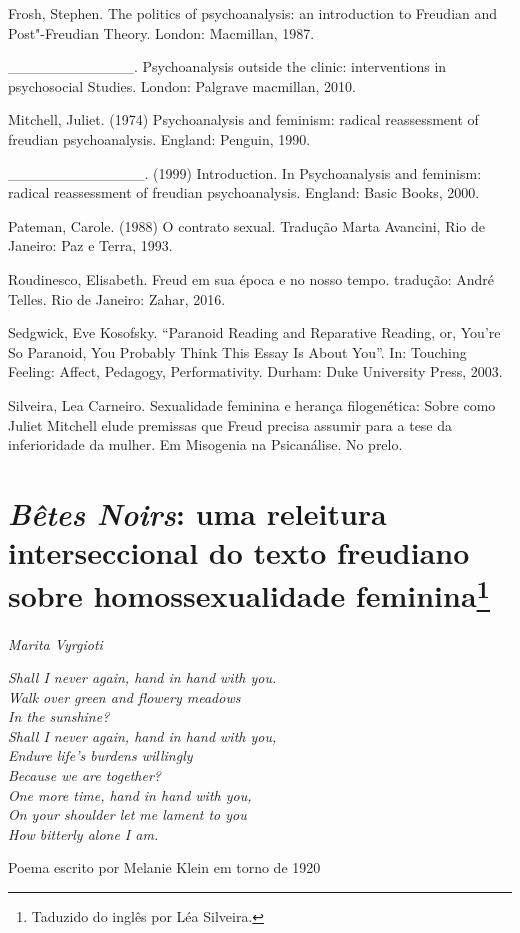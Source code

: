 Frosh, Stephen. The politics of psychoanalysis: an introduction to
Freudian and Post"-Freudian Theory. London: Macmillan, 1987.

\_\_\_\_\_\_\_\_\_\_\_\_. Psychoanalysis outside the clinic:
interventions in psychosocial Studies. London: Palgrave macmillan, 2010.

Mitchell, Juliet. (1974) Psychoanalysis and feminism: radical
reassessment of freudian psychoanalysis. England: Penguin, 1990.

\_\_\_\_\_\_\_\_\_\_\_\_\_. (1999) Introduction. In Psychoanalysis and
feminism: radical reassessment of freudian psychoanalysis. England:
Basic Books, 2000.

Pateman, Carole. (1988) O contrato sexual. Tradução Marta Avancini, Rio
de Janeiro: Paz e Terra, 1993.

Roudinesco, Elisabeth. Freud em sua época e no nosso tempo. tradução:
André Telles. Rio de Janeiro: Zahar, 2016.

Sedgwick, Eve Kosofsky. ``Paranoid Reading and Reparative Reading, or,
You're So Paranoid, You Probably Think This Essay Is About You''. In:
Touching Feeling: Affect, Pedagogy, Performativity. Durham: Duke
University Press, 2003.

Silveira, Lea Carneiro. Sexualidade feminina e herança filogenética:
Sobre como Juliet Mitchell elude premissas que Freud precisa assumir
para a tese da inferioridade da mulher. Em Misogenia na Psicanálise. No
prelo.

\chapter*{\emph{Bêtes Noirs}: uma releitura interseccional do texto freudiano
sobre homossexualidade feminina\footnote{Taduzido do inglês por Léa
  Silveira.}}


\begin{flushright}
\emph{Marita Vyrgioti}
\end{flushright}

\epigraph{\emph{Shall I never again, hand in hand with you.\\
Walk over green and flowery meadows\\
In the sunshine?\\
Shall I never again, hand in hand with you,\\
Endure life's burdens willingly\\
Because we are together?\\
One more time, hand in hand with you,\\
On your shoulder let me lament to you\\
How bitterly alone I am.}}{Poema escrito por Melanie Klein em torno de 1920}

